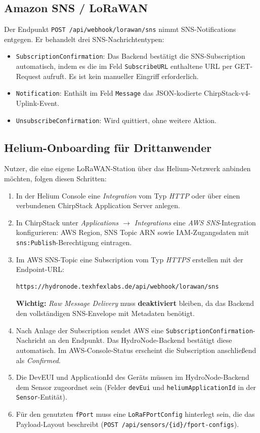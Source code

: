 \subsection*{Amazon SNS / LoRaWAN}

Der Endpunkt \texttt{POST /api/webhook/lorawan/sns} nimmt SNS-Notifications entgegen.
Er behandelt drei SNS-Nachrichtentypen:

\begin{itemize}
  \item \texttt{SubscriptionConfirmation}: Das Backend bestätigt die SNS-Subscription automatisch,
        indem es die im Feld \texttt{SubscribeURL} enthaltene URL per GET-Request aufruft.
        Es ist kein manueller Eingriff erforderlich.
  \item \texttt{Notification}: Enthält im Feld \texttt{Message} das JSON-kodierte ChirpStack-v4-Uplink-Event.
  \item \texttt{UnsubscribeConfirmation}: Wird quittiert, ohne weitere Aktion.
\end{itemize}

\subsection*{Helium-Onboarding für Drittanwender}

Nutzer, die eine eigene LoRaWAN-Station über das Helium-Netzwerk anbinden möchten, folgen
diesen Schritten:

\begin{enumerate}
  \item In der Helium Console eine \textit{Integration} vom Typ \textit{HTTP} oder über einen
        verbundenen ChirpStack Application Server anlegen.
  \item In ChirpStack unter \textit{Applications $\rightarrow$ Integrations} eine
        \textit{AWS SNS}-Integration konfigurieren:
        AWS Region, SNS Topic ARN sowie IAM-Zugangsdaten mit \texttt{sns:Publish}-Berechtigung eintragen.
  \item Im AWS SNS-Topic eine Subscription vom Typ \textit{HTTPS} erstellen mit der Endpoint-URL:
\begin{verbatim}
https://hydronode.texhfexlabs.de/api/webhook/lorawan/sns
\end{verbatim}
        \textbf{Wichtig:} \textit{Raw Message Delivery} muss \textbf{deaktiviert} bleiben, da das Backend den vollständigen SNS-Envelope mit Metadaten benötigt.
  \item Nach Anlage der Subscription sendet AWS eine \texttt{SubscriptionConfirmation}-Nachricht
        an den Endpunkt. Das HydroNode-Backend bestätigt diese automatisch.
        Im AWS-Console-Status erscheint die Subscription anschließend als \textit{Confirmed}.
  \item Die DevEUI und ApplicationId des Geräts müssen im HydroNode-Backend dem Sensor zugeordnet
        sein (Felder \texttt{devEui} und \texttt{heliumApplicationId} in der \texttt{Sensor}-Entität).
  \item Für den genutzten \texttt{fPort} muss eine \texttt{LoRaFPortConfig} hinterlegt sein,
        die das Payload-Layout beschreibt (\texttt{POST /api/sensors/\{id\}/fport-configs}).
\end{enumerate}

